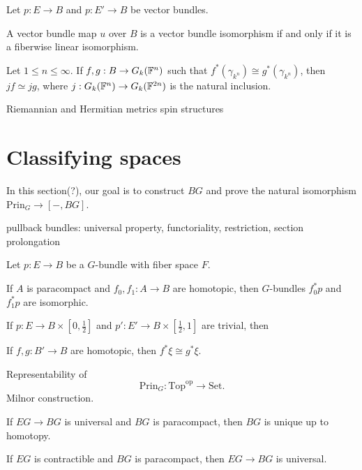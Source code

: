 \documentclass{../../large}
\begin{document}
\begin{prb}
Let $p:E\to B$ and $p:E'\to B$ be vector bundles.
\begin{parts}
\item A vector bundle map $u$ over $B$ is a vector bundle isomorphism if and only if it is a fiberwise linear isomorphism.
\end{parts}
\end{prb}



Let $1\le n\le\infty$.
If $f,g:B\to G_k(\mathbb{F}^n)$ such that $f^*(\gamma_{k^n})\cong g^*(\gamma_{k^n})$, then $jf\simeq jg$, where $j:G_k(\mathbb{F}^n)\to G_k(\mathbb{F}^{2n})$ is the natural inclusion.


\begin{prb}
Riemannian and Hermitian metrics
spin structures
\end{prb}

\section{Classifying spaces}

In this section(?), our goal is to construct $BG$ and prove the natural isomorphism $\mathrm{Prin}_G\to[-,BG]$.

pullback bundles: universal property, functoriality, restriction,
section prolongation

\begin{prb}
Let $p:E\to B$ be a $G$-bundle with fiber space $F$.
\begin{parts}
\item If $A$ is paracompact and $f_0,f_1:A\to B$ are homotopic, then $G$-bundles $f_0^*p$ and $f_1^*p$ are isomorphic.
\end{parts}
\end{prb}
\begin{pf}

If $p:E\to B\times[0,\frac12]$ and $p':E'\to B\times[\frac12,1]$ are trivial, then 


If $f,g:B'\to B$ are homotopic, then $f^*\xi\cong g^*\xi$.
\end{pf}


\begin{prb}
Representability of
\[\mathrm{Prin}_G:\mathrm{Top}^{\mathrm{op}}\to\mathrm{Set}.\]
Milnor construction.

\begin{prb}
\item If $EG\to BG$ is universal and $BG$ is paracompact, then $BG$ is unique up to homotopy.
\item If $EG$ is contractible and $BG$ is paracompact, then $EG\to BG$ is universal.
\end{prb}
\end{prb}
\end{document}
